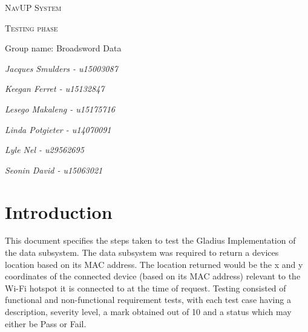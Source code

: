 \documentclass{article}
\begin{document}
\begin{titlepage}
	{\scshape\LARGE NavUP System\par}
	\vfill
	{\scshape\Large Testing phase\par}
	\vfill
	{\Large Group name: Broadsword Data\par}
	\bigskip
	{\itshape\Large Jacques Smulders - u15003087\par}
	{\itshape\Large Keegan Ferret - u15132847\par}
	{\itshape\Large Lesego Makaleng - u15175716\par}
	{\itshape\Large Linda Potgieter - u14070091\par}
  {\itshape\Large Lyle Nel - u29562695\par}
	{\itshape\Large Seonin David - u15063021\par}
	\vfill
\end{titlepage}

\tableofcontents

\clearpage

\section{Introduction}
This document specifies the steps taken to test the Gladius Implementation of the data subsystem. The data subsystem was required to return a devices location based on its MAC address. The location returned would be the x and y coordinates of the connected device (based on its MAC address) relevant to the Wi-Fi hotspot it is connected to at the time of request. Testing consisted of functional and non-functional requirement tests, with each test case having a description, severity level, a mark obtained out of 10 and a status which may either be Pass or Fail.


\newcommand{\FuncReq} [5]{
    \refstepcounter{FuncReqSerial}
	\noindent
    \textbf{Serial}:F\theFuncReqSerial\\
    \textbf{Title}: #1\\
    \textbf{Description}: #2\\
    \textbf{Severity}: #3\\
    \textbf{Score}: #4\\
    \textbf{Status}: #5\\
}


\newcommand{\NonFuncReq} [5]{
\refstepcounter{NonFuncReqSerial}
\noindent
\textbf{Serial}:NF\theNonFuncReqSerial\\
\textbf{Title}: #1\\
\textbf{Description}: #2\\
\textbf{Severity}: #3\\
\textbf{Score}: #4\\
\textbf{Status}: #5\\
}




\end{document}
